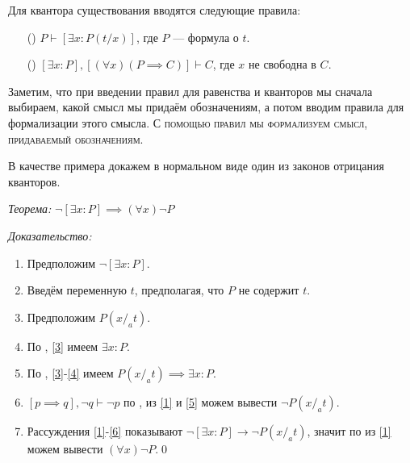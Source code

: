Для квантора существования вводятся следующие правила:
\begin{enumerate}
	\item[(\Eii{})]$P\vdash [\exists x:P(t/x)]$, где $P$ --- формула о $t$.
	\item[(\Eee{})]$[\exists x:P],[(\forall x)(P\implies C)]\vdash C$,
	где $x$ не свободна в $C$.
\end{enumerate}

Заметим, что при введении правил для равенства и кванторов мы
сначала выбираем, какой смысл мы придаём обозначениям, а потом вводим
правила для формализации этого смысла.
\textsc{С помощью правил мы формализуем смысл, придаваемый обозначениям.}

В качестве примера докажем в нормальном виде один из законов отрицания кванторов.

{\it Теорема:} $\lnot [\exists x:P]\implies  (\forall x)\lnot P$

{\it Доказательство:}
\begin{enumerate}[label=(\arabic*)]
	\item{}\label{1}Предположим $\lnot [\exists x:P]$.
	\item{}\label{2}Введём переменную $t$, предполагая, что $P$ не содержит $t$.
	\item{}\label{3}Предположим $P(x/_{a}t)$.
	\item{}\label{4}По \Eii{}, \ref{3} имеем $\exists x:P$.
	\item{}\label{5}По \implic{}, \ref{3}-\ref{4} имеем
	$P(x/_{a}t)\implies \exists x:P$.
	\item{}\label{6}${[p\implies q],\lnot q\vdash \lnot p}$ по \taut{}, из
	\ref{1} и \ref{5} можем вывести $\lnot P(x/_{a}t)$.
	\item{}\label{7}Рассуждения \ref{1}-\ref{6} показывают
	$\lnot[\exists x:P]\to\lnot P(x/_{a}t)$, значит по \Aii{} из \ref{1} можем
	вывести $(\forall x)\lnot P$.\qed
\end{enumerate}


